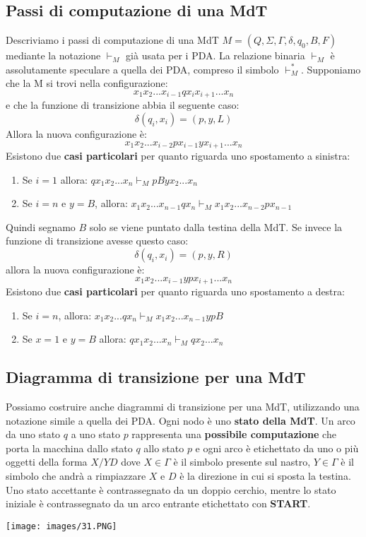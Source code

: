 \documentclass[12pt]{article}
\begin{document}
\subsection{Passi di computazione di una MdT}
Descriviamo i passi di computazione di una MdT $M = (Q, \Sigma, \Gamma, \delta, q_0, B, F)$ mediante la notazione $\vdash_M$ già usata per i PDA. La relazione binaria $\vdash_M$ è assolutamente speculare a quella dei PDA, compreso il simbolo $\vdash^*_M$. Supponiamo che la M si trovi nella configurazione:
$$x_1x_2...x_{i-1}qx_ix_{i+1}...x_n$$
e che la funzione di transizione abbia il seguente caso: $$\delta(q_i, x_i) = (p, y, L)$$
Allora la nuova configurazione è:
$$x_1x_2...x_{i-2}px_{i-1}yx_{i+1}...x_n$$
Esistono due \textbf{casi particolari} per quanto riguarda uno spostamento a sinistra:
\begin{enumerate}
    \item Se $i = 1$ allora: $qx_1x_2...x_n \vdash_M pByx_2...x_n$
    \item Se $i = n$ e $y = B$, allora: $x_1x_2...x_{n-1}qx_n \vdash_M x_1x_2...x_{n-2}px_{n-1}$
\end{enumerate}
Quindi segnamo $B$ solo se viene puntato dalla testina della MdT.
Se invece la funzione di transizione avesse questo caso:
$$\delta(q_i, x_i) = (p, y, R)$$
allora la nuova configurazione è:
$$x_1x_2...x_{i-1}ypx_{i+1}...x_n$$
Esistono due \textbf{casi particolari} per quanto riguarda uno spostamento a destra:
\begin{enumerate}
    \item Se $i = n$, allora: $x_1x_2...qx_n \vdash_M x_1x_2...x_{n-1}ypB$
    \item Se $x = 1$ e $y = B$ allora: $qx_1x_2...x_n \vdash_M qx_2...x_n$
\end{enumerate}
\subsection{Diagramma di transizione per una MdT}
Possiamo costruire anche diagrammi di transizione per una MdT, utilizzando una notazione simile a quella dei PDA. Ogni nodo è uno \textbf{stato della MdT}. Un arco da uno stato $q$ a uno stato $p$ rappresenta una \textbf{possibile computazione} che porta la macchina dallo stato $q$ allo stato $p$ e ogni arco è etichettato da uno o più oggetti della forma $X/YD$ dove $X \in \Gamma$ è il simbolo presente sul nastro, $Y \in \Gamma$ è il simbolo che andrà a rimpiazzare $X$ e $D$ è la direzione in cui si sposta la testina. Uno stato accettante è contrassegnato da un doppio cerchio, mentre lo stato iniziale è contrassegnato da un arco entrante etichettato con \textbf{START}.
\begin{center}
    \texttt{[image: images/31.PNG]}
\end{center}
\newpage
\end{document}

